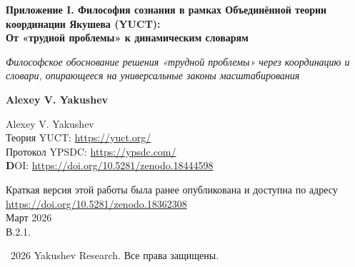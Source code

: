 \documentclass[12pt,a4paper]{article}
\begin{document}
	
	\begin{titlepage}
		\begin{center}
			\vspace*{0cm}
			
			\Huge\textbf{Приложение I. Философия сознания в рамках Объединённой теории координации Якушева (YUCT):\\ От «трудной проблемы» к динамическим словарям}
			
			\vspace{1cm}
			
			\small\textit{Философское обоснование решения «трудной проблемы» через координацию и словари, опирающееся на универсальные законы масштабирования}
			
			\vspace{0.5cm}
			
			\small\textbf{Alexey V. Yakushev}
			
			\vspace{0.5cm}
			\Large
			Alexey V. Yakushev\\
			
			Теория YUCT: \url{https://yuct.org/}\\
			Протокол YPSDC: \url{https://ypsdc.com/}\\
			
			
			\vspace{1cm}
			\textbf DOI: \url{https://doi.org/10.5281/zenodo.18444598}\\
			
			\vspace{0.5cm}
			
			\vspace{0cm}
			\large 
			Краткая версия этой работы была ранее опубликована и доступна по адресу\\ \url{https://doi.org/10.5281/zenodo.18362308}\\
			\vspace{1cm}
			Март 2026 \\ \large В.2.1.
			
			\vspace{4cm}
			\textcopyright~2026 Yakushev Research. Все права защищены.
			
			\newpage
			
			\begin{abstract}
				\noindent
				В данной статье предлагается философское обоснование решения «трудной проблемы сознания» в рамках Объединённой теории координации (YUCT). Сознание понимается не как эпифеномен или иллюзия, а как \textbf{динамический координационный процесс}, реализуемый через иерархию \textbf{внутренних словарей}. Показывается, что классический дуализм «мозг–сознание» преодолевается с помощью трёхуровневой модели: \textbf{генетического}, \textbf{нейронного} и \textbf{культурного словарей}. Субъективный опыт интерпретируется как результат \textbf{живой координации} между нейронными ансамблями с использованием общих семантических пространств. Мета-словарь (способность рефлексировать над собственными состояниями) объясняет феномен самости.
				

\end{abstract}
\end{center}
\end{titlepage}
\end{document}
